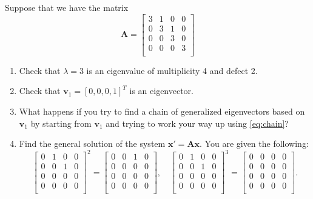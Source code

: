 \documentclass[11pt]{article}
\newcommand{\bA}{\mathbf{A}}
\newcommand{\bx}{\mathbf{x}}
\newcommand{\bv}{\mathbf{v}}
\renewcommand{\l}{\lambda}
\begin{document}
\begin{enumerate}
Suppose that we have the matrix
\begin{equation}
    \bA=\left[
\begin{array}{cccc}
 3 & 1 & 0 & 0 \\
 0 & 3 & 1 & 0 \\
 0 & 0 & 3 & 0 \\
 0 & 0 & 0 & 3 \\
\end{array}
\right]
\end{equation}
\begin{enumerate}
    \item Check that $\l=3$ is an eigenvalue of multiplicity 4 and defect 2.
    \item Check that $\bv_1=[0,0,0,1]^T$ is an eigenvector.
    \item What happens if you try to find a chain of generalized eigenvectors based on $\bv_1$ by starting from $\bv_1$ and trying to work your way up using \eqref{eq:chain}?

    \item Find the general solution of the system $\bx'=\bA\bx$.
    You are given the following:
    \begin{equation}
        \left[
\begin{array}{cccc}
 0 & 1 & 0 & 0 \\
 0 & 0 & 1 & 0 \\
 0 & 0 & 0 & 0 \\
 0 & 0 & 0 & 0 \\
\end{array}
\right]^2=\left[
\begin{array}{cccc}
 0 & 0 & 1 & 0 \\
 0 & 0 & 0 & 0 \\
 0 & 0 & 0 & 0 \\
 0 & 0 & 0 & 0 \\
\end{array}
\right],\quad  \left[
\begin{array}{cccc}
 0 & 1 & 0 & 0 \\
 0 & 0 & 1 & 0 \\
 0 & 0 & 0 & 0 \\
 0 & 0 & 0 & 0 \\
\end{array}
\right]^3=\left[
\begin{array}{cccc}
 0 & 0 & 0 & 0 \\
 0 & 0 & 0 & 0 \\
 0 & 0 & 0 & 0 \\
 0 & 0 & 0 & 0 \\
\end{array}
\right].
    \end{equation}
\end{enumerate}


\end{enumerate}
\end{document}
